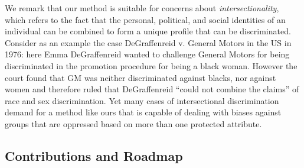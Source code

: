 %
%
%
%
%
%


We remark that our method is suitable for concerns about \emph{intersectionality}, which refers to the fact that the personal, political, and social identities of an individual can be combined to form a unique profile that can be discriminated.
%
Consider as an example the case DeGraffenreid v. General Motors in the US in 1976: here Emma DeGraffenreid wanted to challenge General Motors for being discriminated in the promotion procedure for being a black woman.
%
However the court found that GM was neither discriminated against blacks, nor against women and therefore ruled that DeGraffenreid ``could not combine the claims'' of race and sex discrimination.
%
Yet many cases of intersectional discrimination demand for a method like ours that is capable of dealing with biases against groups that are oppressed based on more than one protected attribute.

\subsection{Contributions and Roadmap}

